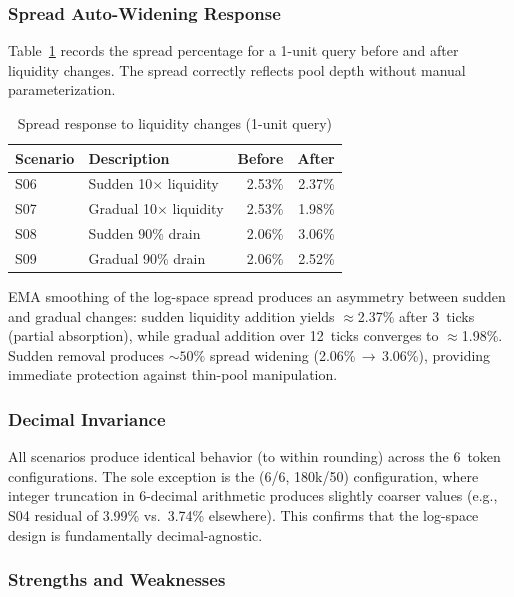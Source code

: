 \documentclass[10pt,a4paper,twocolumn]{article}
\begin{document}
\subsubsection{Spread Auto-Widening Response}

Table~\ref{tab:scenario-spread} records the spread percentage for a 1-unit query before and after liquidity changes. The spread correctly reflects pool depth without manual parameterization.

\begin{table}[H]
\centering
\small
\caption{Spread response to liquidity changes (1-unit query)}
\label{tab:scenario-spread}
\begin{tabularx}{0.95\columnwidth}{@{}l X r r@{}}
\toprule
Scenario & Description & Before & After \\
\midrule
S06 & Sudden 10$\times$ liquidity & 2.53\% & 2.37\% \\
S07 & Gradual 10$\times$ liquidity & 2.53\% & 1.98\% \\
S08 & Sudden 90\% drain & 2.06\% & 3.06\% \\
S09 & Gradual 90\% drain & 2.06\% & 2.52\% \\
\bottomrule
\end{tabularx}
\end{table}

EMA smoothing of the log-space spread produces an asymmetry between sudden and gradual changes: sudden liquidity addition yields $\approx$2.37\% after 3~ticks (partial absorption), while gradual addition over 12~ticks converges to $\approx$1.98\%. Sudden removal produces ${\sim}50\%$ spread widening (2.06\%\,$\to$\,3.06\%), providing immediate protection against thin-pool manipulation.

\subsubsection{Decimal Invariance}

All scenarios produce identical behavior (to within rounding) across the 6~token configurations. The sole exception is the (6/6, 180k/50) configuration, where integer truncation in 6-decimal arithmetic produces slightly coarser values (e.g., S04 residual of 3.99\% vs.\ 3.74\% elsewhere). This confirms that the log-space design is fundamentally decimal-agnostic.

\subsubsection{Strengths and Weaknesses}
\end{document}
